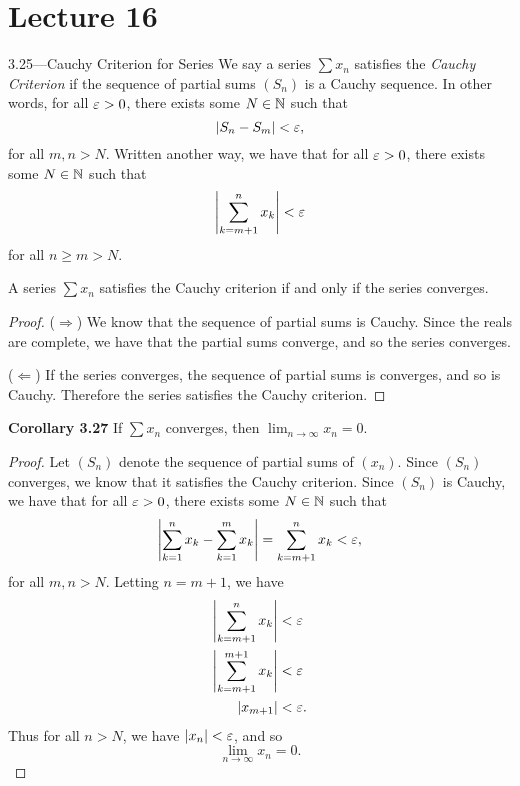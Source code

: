 \documentclass[class=article, crop=false]{standalone}
\begin{document}
  \section{Lecture 16}
  \begin{definition}{3.25---Cauchy Criterion for Series}
    We say a series $\sum x_n$ satisfies the \emph{Cauchy Criterion} if the sequence of partial sums $(S_n)$ is a Cauchy sequence. In other words, for all $\varepsilon > 0$, there exists some $N\in\mathbb{N}$ such that
    \[
      \left\lvert S_n - S_m \right\rvert < \varepsilon,
    \]
    for all $m, n > N$. Written another way, we have that for all $\varepsilon > 0$, there exists some $N\in\mathbb{N}$ such that
    \[
      \left\lvert \sum_{k=m + 1}^{n}x_k \right\rvert < \varepsilon
    \]
    for all $n\geq m > N$.
  \end{definition}
  \begin{theorem}{3.26}
    A series $\sum x_n$ satisfies the Cauchy criterion if and only if the series converges.
    \begin{proof}
      ($\Rightarrow$) We know that the sequence of partial sums is Cauchy. Since the reals are complete, we have that the partial sums converge, and so the series converges. \par
      ($\Leftarrow$) If the series converges, the sequence of partial sums is converges, and so is Cauchy. Therefore the series satisfies the Cauchy criterion.
    \end{proof}
  \end{theorem}
  \textbf{Corollary 3.27} If $\sum x_n$ converges, then $\lim_{n\to \infty} x_n = 0$.
  \begin{proof}
    Let $(S_n)$ denote the sequence of partial sums of $(x_n)$. Since $(S_n)$ converges, we know that it satisfies the Cauchy criterion. Since $(S_n)$ is Cauchy, we have that for all $\varepsilon > 0$, there exists some $N\in\mathbb{N}$ such that
    \[
      \left\lvert \sum_{k=1}^{n}x_k - \sum_{k=1}^{m}x_k \right\rvert = \sum_{k=m + 1}^{n}x_k < \varepsilon,
    \]
    for all $m,n > N$. Letting $n = m + 1$, we have
    \begin{align*}
      \left\lvert \sum_{k=m + 1}^{n}x_k \right\rvert &< \varepsilon \\
      \left\lvert \sum_{k=m + 1}^{m + 1}x_k \right\rvert &< \varepsilon \\
      \left\lvert x_{m + 1} \right\rvert &< \varepsilon.
    \end{align*}
    Thus for all $n > N$, we have $\left\lvert x_n \right\rvert < \varepsilon$, and so
    \[
      \lim_{n\to \infty} x_n = 0.
    \]
  \end{proof}
\end{document}
